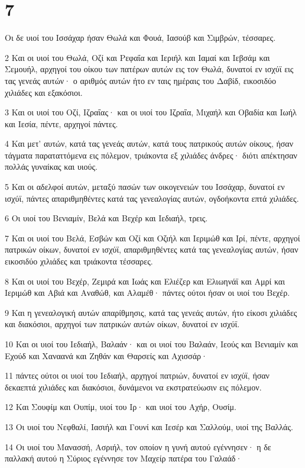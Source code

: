 \chapter{7}

\par Οι δε υιοί του Ισσάχαρ ήσαν Θωλά και Φουά, Ιασούβ και Σιμβρών, τέσσαρες.
\par 2 Και οι υιοί του Θωλά, Οζί και Ρεφαΐα και Ιεριήλ και Ιαμαί και Ιεβσάμ και Σεμουήλ, αρχηγοί του οίκου των πατέρων αυτών εις τον Θωλά, δυνατοί εν ισχύϊ εις τας γενεάς αυτών· ο αριθμός αυτών ήτο εν ταις ημέραις του Δαβίδ, εικοσιδύο χιλιάδες και εξακόσιοι.
\par 3 Και οι υιοί του Οζί, Ιζραΐας· και οι υιοί του Ιζραΐα, Μιχαήλ και Οβαδία και Ιωήλ και Ιεσία, πέντε, αρχηγοί πάντες.
\par 4 Και μετ' αυτών, κατά τας γενεάς αυτών, κατά τους πατρικούς αυτών οίκους, ήσαν τάγματα παραταττόμενα εις πόλεμον, τριάκοντα εξ χιλιάδες άνδρες· διότι απέκτησαν πολλάς γυναίκας και υιούς.
\par 5 Και οι αδελφοί αυτών, μεταξύ πασών των οικογενειών του Ισσάχαρ, δυνατοί εν ισχύϊ, πάντες απαριθμηθέντες κατά τας γενεαλογίας αυτών, ογδοήκοντα επτά χιλιάδες.
\par 6 Οι υιοί του Βενιαμίν, Βελά και Βεχέρ και Ιεδιαήλ, τρεις.
\par 7 Και οι υιοί του Βελά, Εσβών και Οζί και Οζιήλ και Ιεριμώθ και Ιρί, πέντε, αρχηγοί πατρικών οίκων, δυνατοί εν ισχύϊ, απαριθμηθέντες κατά τας γενεαλογίας αυτών, ήσαν εικοσιδύο χιλιάδες και τριάκοντα τέσσαρες.
\par 8 Και οι υιοί του Βεχέρ, Ζεμιρά και Ιωάς και Ελιέζερ και Ελιωηνάϊ και Αμρί και Ιεριμώθ και Αβιά και Αναθώθ, και Αλαμέθ· πάντες ούτοι ήσαν οι υιοί του Βεχέρ.
\par 9 Και η γενεαλογική αυτών απαρίθμησις, κατά τας γενεάς αυτών, ήτο είκοσι χιλιάδες και διακόσιοι, αρχηγοί των πατρικών αυτών οίκων, δυνατοί εν ισχύϊ.
\par 10 Και οι υιοί του Ιεδιαήλ, Βαλαάν· και οι υιοί του Βαλαάν, Ιεούς και Βενιαμίν και Εχούδ και Χαναανά και Ζηθάν και Θαρσείς και Αχισσάρ·
\par 11 πάντες ούτοι οι υιοί του Ιεδιαήλ, αρχηγοί πατριών, δυνατοί εν ισχύϊ, ήσαν δεκαεπτά χιλιάδες και διακόσιοι, δυνάμενοι να εκστρατεύωσιν εις πόλεμον.
\par 12 Και Σουφίμ και Ουπίμ, υιοί του Ιρ· και υιοί του Αχήρ, Ουσίμ.
\par 13 Οι υιοί του Νεφθαλί, Ιασιήλ και Γουνί και Ιεσέρ και Σαλλούμ, υιοί της Βαλλάς.
\par 14 Οι υιοί του Μανασσή, Ασριήλ, τον οποίον η γυνή αυτού εγέννησεν· η δε παλλακή αυτού η Σύριος εγέννησε τον Μαχείρ πατέρα του Γαλαάδ·
